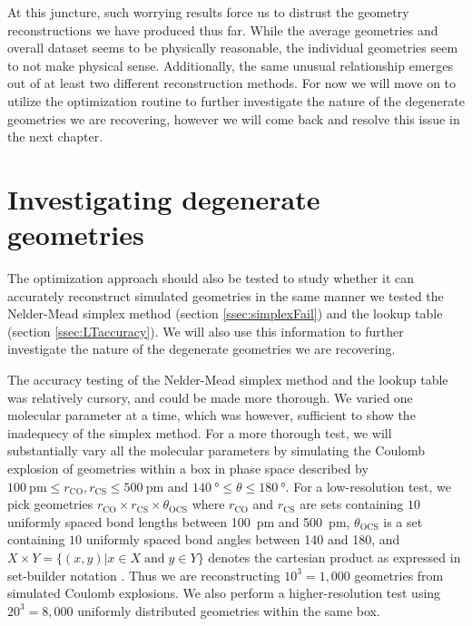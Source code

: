 At this juncture, such worrying results force us to distrust the geometry reconstructions we have produced thus far. While the average geometries and overall dataset seems to be physically reasonable, the individual geometries seem to not make physical sense. Additionally, the same unusual relationship emerges out of at least two different reconstruction methods. For now we will move on to utilize the optimization routine to further investigate the nature of the degenerate geometries we are recovering, however we will come back and resolve this issue in the next chapter.

\section{Investigating degenerate geometries}
The optimization approach should also be tested to study whether it can accurately reconstruct simulated geometries in the same manner we tested the Nelder-Mead simplex method (section \ref{ssec:simplexFail}) and the lookup table (section \ref{ssec:LTaccuracy}). We will also use this information to further investigate the nature of the degenerate geometries we are recovering.

The accuracy testing of the Nelder-Mead simplex method and the lookup table was relatively cursory, and could be made more thorough. We varied one molecular parameter at a time, which was however, sufficient to show the inadequecy of the simplex method. For a more thorough test, we will substantially vary all the molecular parameters by simulating the Coulomb explosion of geometries within a box in phase space described by $\SI{100}{\pico\meter} \le r_\mathrm{CO}, r_\mathrm{CS} \le \SI{500}{\pico\meter}$ and $\SI{140}{\degree} \le \theta \le \SI{180}{\degree}$. For a low-resolution test, we pick geometries $r_\mathrm{CO} \times r_\mathrm{CS} \times \theta_\mathrm{OCS}$ where $r_\mathrm{CO}$ and $r_\mathrm{CS}$ are sets containing $10$ uniformly spaced bond lengths between \SI{100}{\pico\meter} and \SI{500}{\pico\meter}, $\theta_\mathrm{OCS}$ is a set containing $10$ uniformly spaced bond angles between \SI{140}{\deg} and \SI{180}{\deg}, and $X \times Y = \lbrace (x,y) | x \in X \;\mathrm{and}\; y \in Y \rbrace$ denotes the cartesian product as expressed in set-builder notation \citep[p. 6]{Warner90}. Thus we are reconstructing $10^3 = 1,000$ geometries from simulated Coulomb explosions. We also perform a higher-resolution test using $20^3 = 8,000$ uniformly distributed geometries within the same box.

